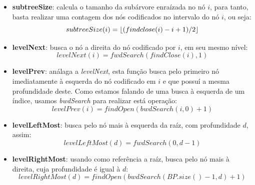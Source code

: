 \begin{itemize}
        \item  \textbf{subtreeSize}: calcula o tamanho da subárvore enraízada no nó $i$, para tanto, basta realizar uma contagem dos nós codificados no intervalo do 
        nó $i$, ou seja:
        $$subtreeSize(i)= \lfloor(findclose(i) - i + 1)/2\rfloor$$
        
        \item \textbf{levelNext}: busca o nó a direita do nó codificado por $i$, em seu mesmo nível:
        $$levelNext(i) = fwdSearch(findClose(i),1)$$
        
        \item \textbf{levelPrev}: análaga a \textit{levelNext}, esta função busca pelo primeiro nó imediatamente à esquerda do nó codificado em $i$ e que possuí a mesma profundidade deste. Como estamos falando de uma busca à esquerda de um índice, usamos \textit{bwdSearch} para realizar está operação:
        $$levelPrev(i) = findOpen(bwdSearch(i,0)+1)$$
        
        \item \textbf{levelLeftMost}: busca pelo nó mais à esquerda da raíz, com profundidade $d$, assim:
        $$levelLeftMost(d) = fwdSearch(0,d-1)$$
        
        \item \textbf{levelRightMost}: usando como referência a raíz, busca pelo nó mais à direita, cuja profundidade é igual  à $d$:
        $$levelRightMost(d) = findOpen(bwdSearch(BP.size()-1,d)+1)$$
    \end{itemize}
    
